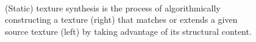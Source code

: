 \begin{figure}[t]
\begin{center}
	\\
	\caption[Texture synthesis.]{(Static) texture synthesis is the process of algorithmically constructing a texture (right) that matches or extends a given source texture (left) by taking advantage of its structural content.}
	\vspace{-0.65cm}
	\label{fig:texture_synthesis}
\end{center}
\end{figure}